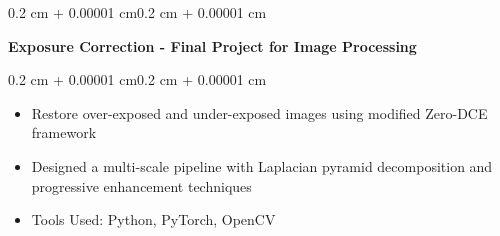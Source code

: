 \documentclass[10pt, letterpaper]{article}
\newenvironment{highlights}{
    \begin{itemize}[
        topsep=0.05 cm,
        parsep=0.05 cm,
        partopsep=0pt,
        itemsep=0pt,
        leftmargin=0.4 cm + 10pt
    ]
}{
    \end{itemize}
}
\newenvironment{onecolentry}{
    \begin{adjustwidth}{0.2 cm + 0.00001 cm}{0.2 cm + 0.00001 cm}
}{
    \end{adjustwidth}
}
\newenvironment{twocolentry}[2][]{
    \onecolentry
    \def\secondColumn{#2}
    \setcolumnwidth{\fill, 4.5 cm}
    \begin{paracol}{2}
}{
    \switchcolumn \raggedleft \secondColumn
    \end{paracol}
    \endonecolentry
}
\let\hrefWithoutArrow\href
\renewcommand{\href}[2]{\hrefWithoutArrow{#1}{\ifthenelse{\equal{#2}{}}{ }{#2 }\raisebox{.15ex}{\footnotesize \faExternalLink*}}}
\begin{document}
        
        \vspace{0.10 cm}
        \begin{twocolentry}{
        \textit{\href{https://github.com/ChuEating1005/Exposure-Correction}{Link}}}
            \textbf{Exposure Correction - Final Project for Image Processing} 
        \end{twocolentry}
        \vspace{0.05 cm}
        \begin{onecolentry}
            \begin{highlights}
                \item Restore over-exposed and under-exposed images using modified Zero-DCE framework
                \item Designed a multi-scale pipeline with Laplacian pyramid decomposition and progressive enhancement techniques
                \item Tools Used: Python, PyTorch, OpenCV
            \end{highlights}
        \end{onecolentry}
        
\end{document}
